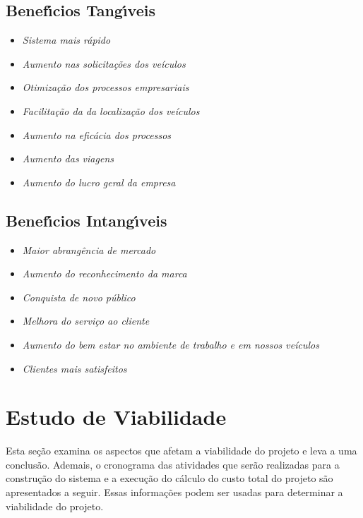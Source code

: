 \subsection{Benef\'{\i}cios Tang\'{\i}veis}
\begin{itemize}

      \item \textit{Sistema mais rápido}
      \item \textit{Aumento nas solicitações dos veículos}
      \item \textit{Otimização dos processos empresariais}
      \item \textit{Facilitação da da localização dos veículos}
      \item \textit{Aumento na eficácia dos processos}
      \item \textit{Aumento das viagens}
      \item \textit{Aumento do lucro geral da empresa}



\end{itemize}

\subsection{Benef\'{\i}cios Intang\'{\i}veis}
\begin{itemize}

      \item \textit{Maior abrangência de mercado}
      \item \textit{Aumento do reconhecimento da marca}
      \item \textit{Conquista de novo público}
      \item \textit{Melhora do serviço ao cliente}
      \item \textit{Aumento do bem estar no ambiente de trabalho e em nossos veículos}
      \item \textit{Clientes mais satisfeitos}



\end{itemize}






\section{Estudo de Viabilidade}
Esta seção examina os aspectos que afetam a viabilidade do projeto e leva a uma conclusão. Ademais, o cronograma das atividades que serão realizadas para a construção do sistema e a execução do cálculo do custo total do projeto são apresentados a seguir. Essas informações podem ser usadas para determinar a viabilidade do projeto.

